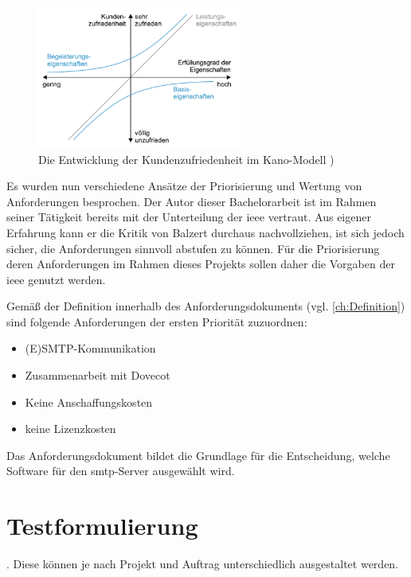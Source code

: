 \begin{figure}[H]
  \centering
  \includegraphics[width=0.6\textwidth]{res/kano.png}
  \caption{Die Entwicklung der Kundenzufriedenheit im Kano-Modell \citep[][545]{Balzert2010})}
  \label{fig:Kanomodell}
\end{figure}

Es wurden nun verschiedene Ansätze der Priorisierung und Wertung von Anforderungen besprochen. Der Autor dieser Bachelorarbeit ist im Rahmen seiner Tätigkeit bereits mit der Unterteilung der \ac{ieee} vertraut. Aus eigener Erfahrung kann er die Kritik von Balzert durchaus nachvollziehen, ist sich jedoch sicher, die Anforderungen sinnvoll abstufen zu können. Für die Priorisierung deren Anforderungen im Rahmen dieses Projekts sollen daher die Vorgaben der \ac{ieee} genutzt werden.

Gemäß der Definition innerhalb des Anforderungsdokuments (vgl. \autoref{ch:Definition}) sind folgende Anforderungen der ersten Priorität zuzuordnen:
\begin{itemize}
	\item (E)SMTP-Kommunikation
	\item Zusammenarbeit mit Dovecot
	\item Keine Anschaffungskosten
	\item keine Lizenzkosten
\end{itemize}

Das Anforderungsdokument bildet die Grundlage für die Entscheidung, welche Software für den \ac{smtp}-Server ausgewählt wird.

\section{Testformulierung}
\label{sec:test}

 \citep[][266]{Sommerville2012}. 
Diese können je nach Projekt und Auftrag unterschiedlich ausgestaltet werden.  

